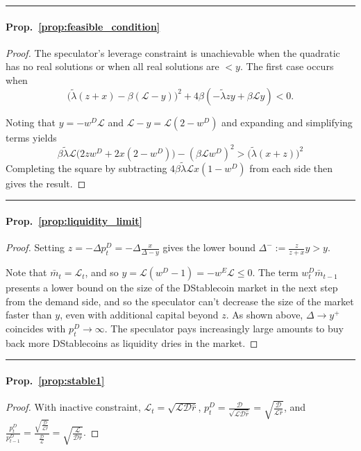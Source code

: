 \noindent\rule{\textwidth}{1pt}
\paragraph{Prop.~\ref{prop:feasible_condition}} \hypertarget{pf:feasible_condition}{}
\begin{proof}
	The speculator's leverage constraint is unachievable when the quadratic has no real solutions or when all real solutions are $<y$. The first case occurs when
	$$\Big(\tilde \lambda (z+x) - \beta(\mathcal{L}-y)\Big)^2 + 4\beta(-\tilde \lambda zy + \beta \mathcal{L} y) < 0.$$
	
	Noting that
	$y = -w^D \mathcal{L}$ and
	$\mathcal{L} - y = \mathcal{L}(2-w^D)$
	and expanding and simplifying terms yields
	$$\beta \tilde\lambda \mathcal{L} \Big( 2zw^D + 2x(2-w^D)\Big) - (\beta\mathcal{L}w^D)^2 > \Big(\tilde \lambda(x+z)\Big)^2$$
	Completing the square by subtracting $4\beta\tilde\lambda\mathcal{L} x(1-w^D)$ from each side then gives the result.
\end{proof}




\noindent\rule{\textwidth}{1pt}
\paragraph{Prop.~\ref{prop:liquidity_limit}} \hypertarget{pf:liquidity_limit}{}
\begin{proof}
	Setting $z=-\Delta p_t^D = -\Delta \frac{x}{\Delta-y}$ gives the lower bound $\Delta^- := \frac{z}{z+x}y>y$.
	
	Note that $\bar m_t = \mathcal{L}_t$, and so
	$y = \mathcal{L}(w^D - 1) = -w^E \mathcal{L} \leq 0.$
	The term $w^D_t \bar m_{t-1}$ presents a lower bound on the size of the DStablecoin market in the next step from the demand side, and so the speculator can't decrease the size of the market faster than $y$, even with additional capital beyond $z$. As shown above, $\Delta \rightarrow y^+$ coincides with $p^D_t \rightarrow \infty$. The speculator pays increasingly large amounts to buy back more DStablecoins as liquidity dries in the market. 
\end{proof}




\noindent\rule{\textwidth}{1pt}
\paragraph{Prop.~\ref{prop:stable1}} \hypertarget{pf:stable1}{}
\begin{proof}
	With inactive constraint, $\mathcal{L}_t = \sqrt{\mathcal{L}\mathcal{D}\hat r}$,
	$p^D_t = \frac{\mathcal{D}}{\sqrt{\mathcal{L}\mathcal{D}\hat r}} = \sqrt{\frac{\mathcal{D}}{\mathcal{L}\hat r}}$, and
	$\frac{p^D_t}{p^D_{t-1}} = \frac{\sqrt{\frac{\mathcal{D}}{\mathcal{L}\hat r}}}{\frac{\mathcal{D}}{\mathcal{L}}} = \sqrt{\frac{\mathcal{L}}{\mathcal{D}\hat r}}.$
\end{proof}





